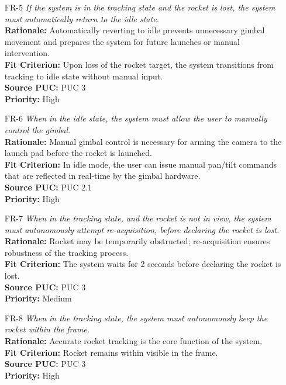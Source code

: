 \documentclass[12pt]{article}
\begin{document}
\begin{itemize}
  \item[FR-5] \emph{If the system is in the tracking state and the rocket is lost, the
          system must automatically return to the idle state.}\\[2mm]
        {\bf Rationale:} Automatically reverting to idle prevents unnecessary gimbal movement and prepares the system for future launches or manual intervention.\\
        {\bf Fit Criterion:} Upon loss of the rocket target, the system transitions from tracking to idle state without manual input.\\
        {\bf Source PUC:} PUC 3 \\
        {\bf Priority:} High

  \item[FR-6] \emph{When in the idle state, the system must allow the user to manually
          control the gimbal.}\\[2mm]
        {\bf Rationale:} Manual gimbal control is necessary for arming the camera to the launch pad before the rocket is launched.\\
        {\bf Fit Criterion:} In idle mode, the user can issue manual pan/tilt commands that are reflected in real-time by the gimbal hardware.\\
        {\bf Source PUC:} PUC 2.1 \\
        {\bf Priority:} High

  \item[FR-7] \emph{When in the tracking state, and the rocket is not in view, the
          system must autonomously attempt re-acquisition, before declaring the rocket is
          lost.}\\[2mm]
        {\bf Rationale:} Rocket may be temporarily obstructed; re-acquisition ensures robustness of the tracking process.\\
        {\bf Fit Criterion:} The system waits for 2 seconds before declaring the rocket is lost.\\
        {\bf Source PUC:} PUC 3 \\
        {\bf Priority:} Medium

  \item[FR-8] \emph{When in the tracking state, the system must autonomously keep the
          rocket within the frame.}\\[2mm]
        {\bf Rationale:} Accurate rocket tracking is the core function of the system.\\
        {\bf Fit Criterion:} Rocket remains within visible in the frame.\\
        {\bf Source PUC:} PUC 3 \\
        {\bf Priority:} High


\end{itemize}
\end{document}
